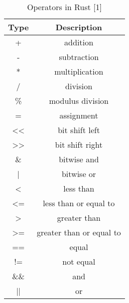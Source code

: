 \documentclass[sigconf,authorversion,nonacm]{acmart}
\begin{document}
\begin{table} [H]
\caption{Operators in Rust [1]}
    \begin{tabular}{ |c|c| }
    \hline
    Type & Description \\
    \hline
    + & addition \\
    \hline
    - & subtraction \\
    \hline
    * & multiplication \\
    \hline
    / & division \\
    \hline
    \% & modulus division \\
    \hline
    = & assignment \\
    \hline
    << & bit shift left \\
    \hline
    >> & bit shift right \\
    \hline
    \& & bitwise and \\
    \hline
    | & bitwise or \\
    \hline
    < & less than \\
    \hline
    <= & less than or equal to \\
    \hline
    > & greater than \\
    \hline
    >= & greater than or equal to \\
    \hline
    == & equal \\
    \hline
    != & not equal \\
    \hline
    \&\& & and \\
    \hline
    || & or \\
    \hline
    \end{tabular}
\end{table}
\end{document}
